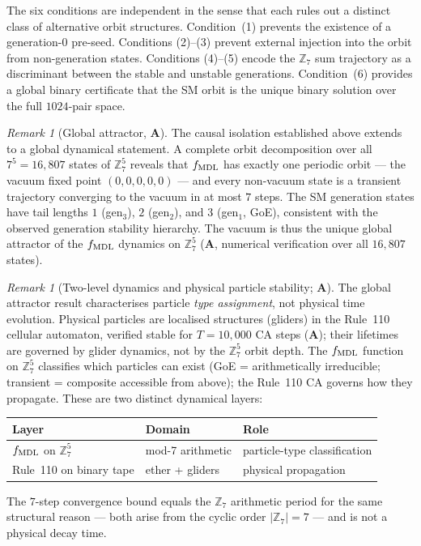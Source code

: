 \documentclass[11pt]{article}
\theoremstyle{remark}
\newtheorem{remark}[theorem]{Remark}
\newcommand{\CatA}{\textbf{A}}
\begin{document}
The six conditions are independent in the sense that each rules out a distinct class of
alternative orbit structures.
Condition~(1) prevents the existence of a generation-0 pre-seed.
Conditions (2)--(3) prevent external injection into the orbit from non-generation states.
Conditions (4)--(5) encode the $\mathbb{Z}_7$ sum trajectory as a discriminant
between the stable and unstable generations.
Condition~(6) provides a global binary certificate that the SM orbit is the unique
binary solution over the full $1024$-pair space.

\begin{remark}[Global attractor, $\CatA$]\label{rem:global_attractor}
The causal isolation established above extends to a global dynamical statement.
A complete orbit decomposition over all $7^5 = 16{,}807$ states of $\mathbb{Z}_7^5$
reveals that $f_{\rm MDL}$ has exactly one periodic orbit --- the vacuum fixed point
$(0,0,0,0,0)$ --- and every non-vacuum state is a transient trajectory converging
to the vacuum in at most $7$ steps.
The SM generation states have tail lengths $1$ (gen$_3$), $2$ (gen$_2$), and
$3$ (gen$_1$, GoE), consistent with the observed generation stability hierarchy.
The vacuum is thus the unique global attractor of the $f_{\rm MDL}$ dynamics
on $\mathbb{Z}_7^5$ ($\CatA$, numerical verification over all $16{,}807$ states).
\end{remark}

\begin{remark}[Two-level dynamics and physical particle stability; $\CatA$]
\label{rem:two_level_dynamics}
The global attractor result characterises particle \emph{type assignment},
not physical time evolution.
Physical particles are localised structures (gliders) in the Rule~110 cellular
automaton, verified stable for $T = 10{,}000$ CA steps ($\CatA$);
their lifetimes are governed by glider dynamics, not by the $\mathbb{Z}_7^5$
orbit depth.
The $f_{\rm MDL}$ function on $\mathbb{Z}_7^5$ classifies which particles
can exist (GoE = arithmetically irreducible; transient = composite accessible
from above); the Rule~110 CA governs how they propagate.
These are two distinct dynamical layers:
\begin{center}
\small
\begin{tabular}{lll}
\hline
\textbf{Layer} & \textbf{Domain} & \textbf{Role} \\
\hline
$f_{\rm MDL}$ on $\mathbb{Z}_7^5$ & mod-7 arithmetic & particle-type classification \\
Rule~110 on binary tape & ether + gliders & physical propagation \\
\hline
\end{tabular}
\end{center}
The $7$-step convergence bound equals the $\mathbb{Z}_7$ arithmetic period for
the same structural reason --- both arise from the cyclic order $|\mathbb{Z}_7| = 7$
--- and is not a physical decay time.
\end{remark}
\end{document}

